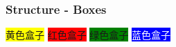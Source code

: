 \documentclass[aspectratio=169,utf8]{ctexbeamer}
\begin{document}
%
%
%
%
%
%
%
%
%
%


\begin{frame}
  \frametitle{Structure - Boxes}

  \centering
  \colorbox{yellow}{黄色盒子}
  \quad
  \colorbox{red}{红色盒子}
  \quad
  \colorbox{green}{绿色盒子}
  \quad
  \colorbox{blue}{\textcolor{white}{蓝色盒子}}
\end{frame}
\end{document}
